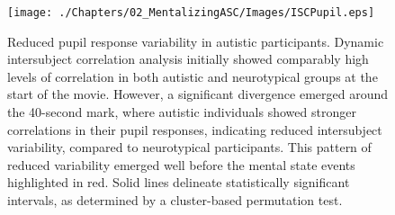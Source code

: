 \begin{figure}[!ht]
    \vspace*{5pt}
	\centering
    \texttt{[image: ./Chapters/02\_MentalizingASC/Images/ISCPupil.eps]}
	\caption{Reduced pupil response variability in autistic participants. Dynamic intersubject correlation analysis initially showed comparably high levels of correlation in both autistic and neurotypical groups at the start of the movie. However, a significant divergence emerged around the 40-second mark, where autistic individuals showed stronger correlations in their pupil responses, indicating reduced intersubject variability, compared to neurotypical participants. This pattern of reduced variability emerged well before the mental state events highlighted in red. Solid lines delineate statistically significant intervals, as determined by a cluster-based permutation test.}
    \vspace*{-15pt}
	\label{fig:isc-pupil-asc}
\end{figure}



